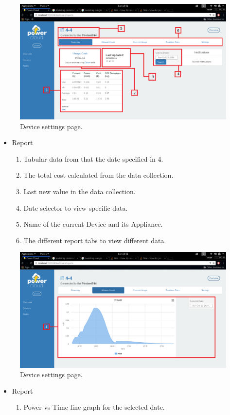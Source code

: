 \documentclass[a4paper,10pt]{article}
\begin{document}
		\begin{figure}[H]
			\includegraphics[width=\textwidth]{images/Reports.png}
			\caption{Device settings page. \label{overflow}}
		\end{figure}
		\begin{itemize}
			\item Report
			\begin{enumerate}
				\item Tabular data from that the date specified in 4.
				\item The total cost calculated from the data collection.
				\item Last new value in the data collection.
				\item Date selector to view specific data.
				\item Name of the current Device and its Appliance.
				\item The different report tabs to view different data.
			\end{enumerate}
		\end{itemize}
		
		\begin{figure}[H]
			\includegraphics[width=\textwidth]{images/Reports_PowerLine.png}
			\caption{Device settings page. \label{overflow}}
		\end{figure}
		\begin{itemize}
			\item Report
			\begin{enumerate}
				\item Power vs Time line graph for the selected date.
			\end{enumerate}
		\end{itemize}
		
\end{document}
